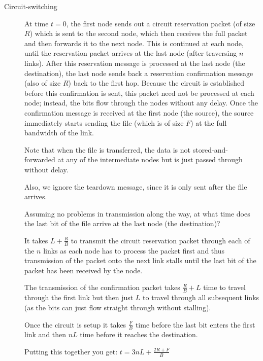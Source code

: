 \documentclass[answers]{supervision}
\begin{document}
\begin{questions}
\begin{parts}
    \begin{description}
      \item[Circuit-switching]
      At time $t = 0$, the first node sends out a circuit reservation packet (of size $R$) which is sent to the second node, which then receives the full packet and then forwards it to the next node. This is continued at each node, until the reservation packet arrives at the last node (after traversing $n$ links). After this reservation message is processed at the last node (the destination), the last node sends back a reservation confirmation message (also of size $R$) back to the first hop. Because the circuit is established before this confirmation is sent, this packet need not be processed at each node; instead, the bits flow through the nodes without any delay. Once the confirmation message is received at the first node (the source), the source immediately starts sending the file (which is of size $F$) at the full bandwidth of the link.
      
      Note that when the file is transferred, the data is not stored-and- forwarded at any of the intermediate nodes but is just passed through without delay.
      
      Also, we ignore the teardown message, since it is only sent after the file arrives.
      
      \begin{subparts}
        \subpart
        Assuming no problems in transmission along the way, at what
time does the last bit of the file arrive at the last node (the
destination)?
        
        \begin{solution}
        It takes $L+\frac{R}{B}$ to transmit the circuit reservation packet through each of the $n$ links as each node has to process the packet first and thus transmission of the packet onto the next link stalls until the last bit of the packet has been received by the node.
        
        The transmission of the confirmation packet takes $\frac{R}{B} + L$ time to travel through the first link but then just $L$ to travel through all subsequent links (as the bits can just flow straight through without stalling).
        
        Once the circuit is setup it takes $\frac{F}{B}$ time before the last bit enters the first link and then $nL$ time before it reaches the destination.
        
        Putting this together you get:
        $t = 3nL+\frac{2R+F}{B}$
        \end{solution}


\end{subparts}
\end{description}
\end{parts}
\end{questions}
\end{document}
